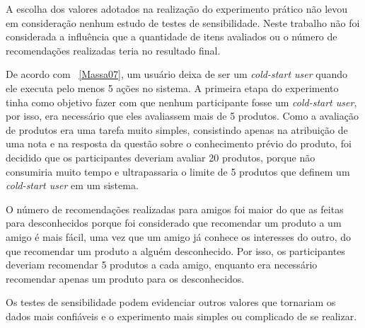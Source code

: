  A escolha dos valores adotados na realização do experimento prático não levou em consideração nenhum estudo de testes de sensibilidade. Neste trabalho não foi considerada a influência que a quantidade de itens avaliados ou o número de recomendações realizadas teria no resultado final.

 De acordo com ~\ref{Massa07}, um usuário deixa de ser um \textit{cold-start user} quando ele executa pelo menos 5 ações no sistema. A primeira etapa do experimento tinha como objetivo fazer com que nenhum participante fosse um \textit{cold-start user}, por isso, era necessário que eles avaliassem mais de 5 produtos. Como a avaliação de produtos era uma tarefa muito simples, consistindo apenas na atribuição de uma nota e na resposta da questão sobre o conhecimento prévio do produto, foi decidido que os participantes deveriam avaliar 20 produtos, porque não consumiria muito tempo e ultrapassaria o limite de 5 produtos que definem um \textit{cold-start user} em um sistema.

 O número de recomendações realizadas para amigos foi maior do que as feitas para desconhecidos porque foi considerado que recomendar um produto a um amigo é mais fácil, uma vez que um amigo já conhece os interesses do outro, do que recomendar um produto a alguém desconhecido. Por isso, os participantes deveriam recomendar 5 produtos a cada amigo, enquanto era necessário recomendar apenas um produto para os desconhecidos.

 Os testes de sensibilidade podem evidenciar outros valores que tornariam os dados mais confiáveis e o experimento mais simples ou complicado de se realizar.



